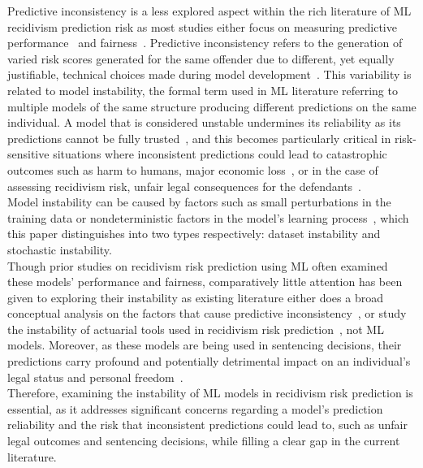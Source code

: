 \documentclass[12pt]{article}
\begin{document}
Predictive inconsistency is a less explored aspect within the rich literature of ML recidivism prediction risk as most studies either focus on measuring predictive performance~\cite{duwe2017out, travaini2022machine, tollenaar2013method} and fairness~\cite{tolan2019machine, dressel2018accuracy, ngo2018traditional}. Predictive inconsistency refers to the generation of varied risk scores generated for the same offender due to different, yet equally justifiable, technical choices made during model development~\cite{greene2022forks}. This variability is related to model instability, the formal term used in ML literature referring to multiple models of the same structure producing different predictions on the same individual. A model that is considered unstable undermines its reliability as its predictions cannot be fully trusted~\cite{riley2023stability}, and this becomes particularly critical in risk-sensitive situations where inconsistent predictions could lead to catastrophic outcomes such as harm to humans, major economic loss~\cite{zhang2024reliability}, or in the case of assessing recidivism risk, unfair legal consequences for the defendants~\cite{greene2022forks}. \\

Model instability can be caused by factors such as small perturbations in the training data or nondeterministic factors in the model's learning process~\cite{riley2023stability, lopez2022instability}, which this paper distinguishes into two types respectively: dataset instability and stochastic instability.\\

Though prior studies on recidivism risk prediction using ML often examined these models' performance and fairness, comparatively little attention has been given to exploring their instability as existing literature either does a broad conceptual analysis on the factors that cause predictive inconsistency~\cite{greene2022forks}, or study the instability of actuarial tools used in recidivism risk prediction~\cite{helmus2015stability}, not ML models. Moreover, as these models are being used in sentencing decisions, their predictions carry profound and potentially detrimental impact on an individual's legal status and personal freedom~\cite{van2022predicting}. \\

Therefore, examining the instability of ML models in recidivism risk prediction is essential, as it addresses significant concerns regarding a model's prediction reliability and the risk that inconsistent predictions could lead to, such as unfair legal outcomes and sentencing decisions, while filling a clear gap in the current literature.\\
\newpage
\end{document}
